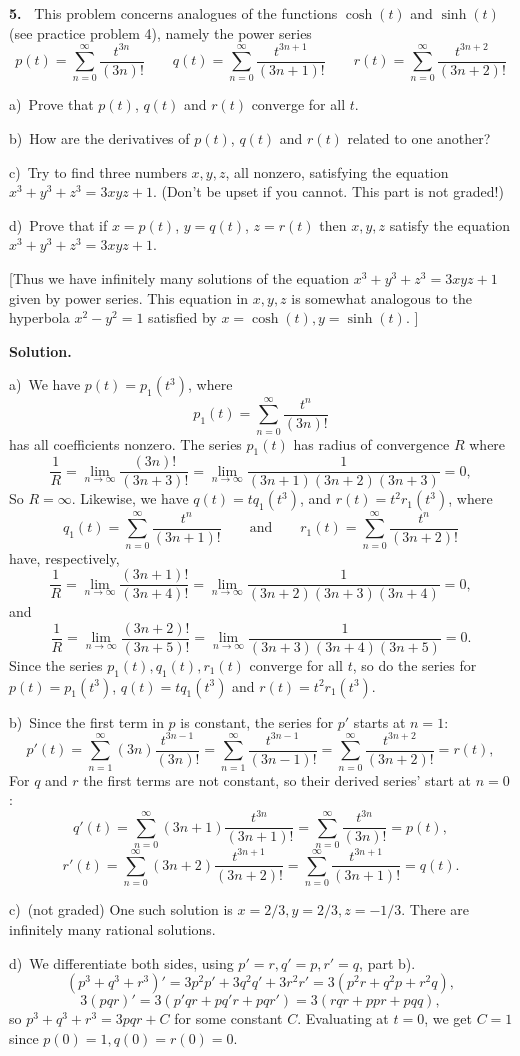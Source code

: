 \documentclass[12pt]{article}
\theoremstyle{definition}
\theoremstyle{remark}
\theoremstyle{definition}
\newenvironment{Solution}{\noindent\textbf{Solution.}}{}
\begin{document}
{\bf 5.\ } 
This problem concerns analogues of the functions $\cosh(t)$ and $\sinh(t)$ (see practice problem 4),
namely the power series 
\[
p(t)= \sum_{n=0}^\infty \frac{t^{3n}}{(3n)!}\qquad
q(t)= \sum_{n=0}^\infty \frac{t^{3n+1}}{(3n+1)!}\qquad
r(t)= \sum_{n=0}^\infty \frac{t^{3n+2}}{(3n+2)!}
\]

a)\ Prove that $p(t)$, $q(t)$ and $r(t)$ converge for all $t$. 

b)\ How are the derivatives of $p(t)$, $q(t)$ and $r(t)$ related to one another? 

c)\ Try  to find  three numbers $x,y,z$, all nonzero, satisfying the equation $x^3+y^3+z^3=3xyz+1$. (Don't be upset if you cannot. This part is not graded!)

d)\ Prove that if  $x=p(t)$, $y=q(t)$, $z=r(t)$ then $x,y,z$ satisfy the equation 
$x^3+y^3+z^3=3xyz+1$. 

[Thus we have infinitely many solutions of the equation $x^3+y^3+z^3=3xyz+1$ given by power series. This equation in $x,y,z$ is somewhat analogous to the hyperbola $x^2-y^2=1$ satisfied by $x=\cosh(t), y=\sinh(t)$. ]

\begin{Solution}

a)\ We have $p(t)=p_1(t^3)$, where 
\[p_1(t)= \sum_{n=0}^\infty \frac{t^{n}}{(3n)!}\]
has all coefficients nonzero. The series $p_1(t)$ has radius of convergence $R$ where
\[\frac{1}{R}=\lim_{n\to\infty}\frac{(3n)!}{(3n+3)!}=\lim_{n\to\infty}\frac{1}{(3n+1)(3n+2)(3n+3)}=0,\]
So $R=\infty$. Likewise, we have $q(t)=tq_1(t^3)$, and $r(t)=t^2r_1(t^3)$, where 
\[q_1(t)= \sum_{n=0}^\infty \frac{t^{n}}{(3n+1)!}\qquad\text{and}\qquad
r_1(t)= \sum_{n=0}^\infty \frac{t^{n}}{(3n+2)!}
\]
have, respectively, 
\[ \frac{1}{R}=\lim_{n\to\infty}\frac{(3n+1)!}{(3n+4)!}=\lim_{n\to\infty}\frac{1}{(3n+2)(3n+3)(3n+4)}=0,
\]
and
\[ \frac{1}{R}=\lim_{n\to\infty}\frac{(3n+2)!}{(3n+5)!}=\lim_{n\to\infty}\frac{1}{(3n+3)(3n+4)(3n+5)}=0.
\]
Since the series $p_1(t), q_1(t), r_1(t)$ converge for all $t$, so do the series for 
$p(t)=p_1(t^3)$, $ q(t)=tq_1(t^3)$ and $ r(t)=t^2r_1(t^3)$. 

b)\ Since the first term in $p$ is constant, the series for $p'$ starts at $n=1$:
\[p'(t)=\sum_{n=1}^\infty(3n) \frac{t^{3n-1}}{(3n)!}
=\sum_{n=1}^\infty \frac{t^{3n-1}}{(3n-1)!}
=\sum_{n=0}^\infty \frac{t^{3n+2}}{(3n+2)!}=r(t),
\] For $q$ and $r$ the first terms are not constant, so their derived series' start at $n=0$:
\[q'(t)=\sum_{n=0}^\infty(3n+1) \frac{t^{3n}}{(3n+1)!}
=\sum_{n=0}^\infty \frac{t^{3n}}{(3n)!}
=p(t),
\]
\[r'(t)=\sum_{n=0}^\infty(3n+2) \frac{t^{3n+1}}{(3n+2)!}
=\sum_{n=0}^\infty \frac{t^{3n+1}}{(3n+1)!}
=q(t).
\]

c)\ (not graded) One such solution is $x=2/3, y=2/3, z=-1/3$. There are infinitely many rational solutions. 

d)\  We differentiate both sides, using $p'=r, q'=p, r'=q$, part b).
\[(p^3+q^3+r^3)'=3p^2p'+3q^2q'+3r^2r'=3(p^2r+q^2p+r^2q),\]
\[3(pqr)'=3(p'qr+pq'r+pqr')=3(rqr+ppr+pqq),\]
so $p^3+q^3+r^3=3pqr+C$ for some constant $C$. Evaluating at $t=0$, we get $C=1$ since $p(0)=1, q(0)=r(0)=0$. 



\end{Solution}
\end{document}

